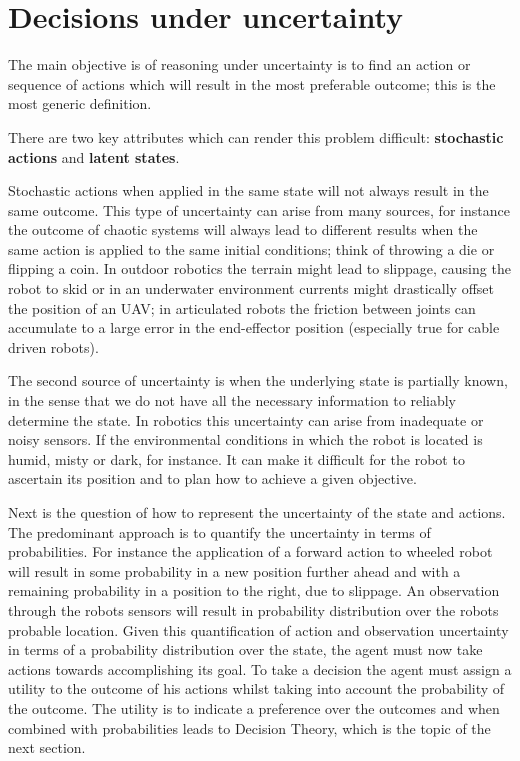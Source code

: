 \section{Decisions under uncertainty}\label{sec:deci_un}

The main objective is of reasoning under uncertainty is to find an action or sequence of
actions which will result in the most preferable outcome; this is the most generic definition.

There are two key attributes which can render this problem difficult: \textbf{stochastic actions} and \textbf{latent states}. 

Stochastic actions when applied in the same state will not always result in the same outcome. This type of uncertainty 
can arise from many sources, for instance the outcome of chaotic systems will always lead to different results when the same action is applied
to the same initial conditions; think of throwing a die or flipping a coin. In outdoor robotics the terrain might lead to slippage, 
causing the robot to skid or in an underwater environment currents might drastically offset the position of an UAV; in articulated 
robots the friction between joints can accumulate to a large error in the end-effector position (especially true 
for cable driven robots).

The second source of uncertainty is when the underlying state is partially known, in the sense that we do not 
have all the necessary information to reliably determine the state. In robotics this 
uncertainty can arise from inadequate or noisy sensors. If the environmental conditions in which the robot 
is located is humid, misty or dark, for instance. It can make it difficult for the robot to ascertain its position and 
to plan how to achieve a given objective.

Next is the question of how to represent the uncertainty of the state and actions. The predominant approach 
is to quantify the uncertainty in terms of probabilities. For instance the application of a forward action to wheeled robot 
will result in some probability in a new position further ahead and with a remaining probability in a position to the right, due to slippage.
An observation through the robots sensors will result in probability distribution over the robots probable location.
Given this quantification of action and observation uncertainty in terms of a probability distribution over the state, 
the agent must now take actions towards accomplishing its goal. To take a decision the agent must assign a utility 
to the outcome of his actions whilst taking into account the probability of the outcome. 
The utility is to indicate a preference over the outcomes and when combined with probabilities leads to Decision Theory, which 
is the topic of the next section. 

